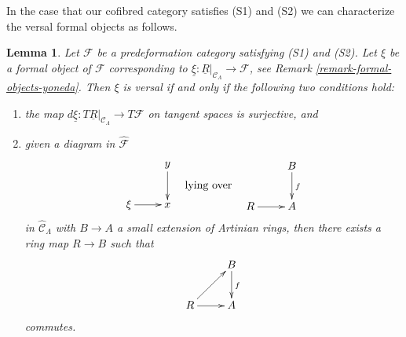 \documentclass{stacks-project}
\theoremstyle{plain}
\newtheorem{lemma}[subsection]{Lemma}
\theoremstyle{definition}
\theoremstyle{remark}
\numberwithin{equation}{subsection}
\begin{document}
\noindent
In the case that our cofibred category satisfies (S1) and (S2)
we can characterize the versal formal objects as follows.

\begin{lemma}
\label{lemma-versal-criterion}
Let $\mathcal{F}$ be a predeformation category satisfying (S1) and
(S2). Let $\xi$ be a formal object of $\mathcal{F}$ corresponding to
$\underline{\xi} : \underline{R}|_{\mathcal{C}_\Lambda} \to \mathcal{F}$, see
Remark \ref{remark-formal-objects-yoneda}.
Then $\xi$ is versal if and only if the following two conditions hold:
\begin{enumerate}
\item the map
$d\underline{\xi} : T\underline{R}|_{\mathcal{C}_\Lambda} \to T\mathcal{F}$
on tangent spaces is surjective, and
\item given a diagram in $\widehat{\mathcal{F}}$
$$
\vcenter{
\xymatrix{
            &  y \ar[d] \\
\xi \ar[r]  &  x
}
}
\quad\text{lying over}\quad
\vcenter{
\xymatrix{
         &   B  \ar[d]^{f} \\
R \ar[r] &   A
}
}
$$
in $\widehat{\mathcal{C}}_\Lambda$ with $B \to A$ a small extension of
Artinian rings, then there exists a ring map $R \to B$ such that
$$
\xymatrix{
         &   B  \ar[d]^{f} \\
R \ar[ur] \ar[r] &   A
}
$$
commutes.
\end{enumerate}
\end{lemma}
\end{document}
